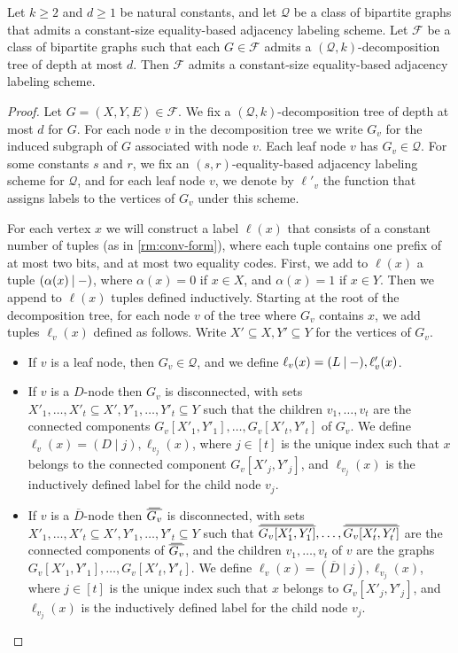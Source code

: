 \documentclass{article}
\newcommand\eqLabelSep{\mathbin|}
\newcommand{\cF}{\ensuremath{\mathcal{F}}}
\newcommand{\cQ}{\ensuremath{\mathcal{Q}}}
\newcommand\doverline[1]{%
  \setbox0=\hbox{$\!\overline{#1}\!$}%
  \ht0=\dimexpr\ht0-.2ex\relax%
  \,\overline{\copy0}\,%
}
\newcommand{\bc}[1]{\doverline{#1}} %
\begin{document}
\begin{lemma}
\label{lemma:bipartite decomposition}
Let $k \geq 2$ and $d \geq 1$ be natural constants, and let $\cQ$ be a class of bipartite graphs that
admits a constant-size equality-based adjacency labeling scheme.
Let $\cF$ be a class of bipartite graphs such that each $G \in \cF$ admits a $(\cQ, k)$-decomposition
tree of depth at most $d$. Then $\cF$ admits a constant-size equality-based adjacency labeling scheme. 
\end{lemma}
\begin{proof}
Let $G=(X,Y,E) \in \cF$. We fix a $(\cQ, k)$-decomposition tree of depth at most $d$ for $G$.
For each node $v$ in the decomposition tree we write $G_v$ for the induced subgraph
of $G$ associated with node $v$.  Each leaf node $v$ has $G_v \in \cQ$. 
For some constants $s$ and $r$, we fix an $(s,r)$-equality-based adjacency labeling scheme for $\cQ$, and for each leaf node $v$, we denote by $\ell'_v$ the function that assigns labels to the vertices of $G_v$ under this scheme.

For each vertex $x$ we will construct a label $\ell(x)$ that consists of a constant number of tuples (as in \cref{rm:conv-form}),
where each tuple contains one prefix of at most two bits, and at most two equality codes.
First, we add to $\ell(x)$ a tuple  $(\alpha(x) \eqLabelSep \mathnormal- )$, where $\alpha(x)=0$ if $x \in X$, and $\alpha(x)=1$
if $x \in Y$. Then we append to $\ell(x)$ tuples defined inductively.
Starting at the root of the decomposition tree, for each node $v$ of the tree where $G_v$ 
contains $x$, we add tuples $\ell_v(x)$ defined as follows.  
Write $X' \subseteq X, Y' \subseteq Y$ for the vertices of $G_v$.
\begin{itemize}
\item If $v$ is a leaf node, then $G_v \in \cQ$, and we define $\ell_v(x) = (L \eqLabelSep \mathnormal-), \ell'_v(x)$.

\item If $v$ is a $D$-node then $G_v$ is disconnected, with sets $X'_1, \dotsc, X'_t \subseteq X',
Y'_1, \dotsc, Y'_t \subseteq Y$ such that the children $v_1, \dotsc, v_t$ are the connected
components $G_v[X'_1, Y'_1], \dotsc, G_v[X'_t, Y'_t]$ of $G_v$. 
We define $\ell_v(x) = (D \eqLabelSep j), \ell_{v_j}(x)$, where $j \in [t]$ is the unique index such that $x$ belongs to the connected component $G_v[X'_j, Y'_j]$, and $\ell_{v_j}(x)$ is the inductively defined label for the child node $v_j$.

\item If $v$ is a $\overline D$-node then $\bc{G_v}$ is disconnected, with sets $X'_1, \dotsc, X'_t \subseteq X',
Y'_1, \dotsc, Y'_t \subseteq Y$ such that $\bc{G_v[X_1',Y_1']}, \dotsc,  \bc{G_v[X_t',Y_t']}$ 
are the connected components of $\bc{G_v}$, and the children $v_1, \dotsc, v_t$ of $v$ are the graphs $G_v[X'_1, Y'_1], \dotsc, G_v[X'_t, Y'_t]$. 
We define $\ell_v(x) = (\overline D \eqLabelSep j), \ell_{v_j}(x)$, where $j \in [t]$ is the unique index such that $x$ belongs to $G_v[X'_j, Y'_j]$, and $\ell_{v_j}(x)$ is the inductively defined label for the child node $v_j$.


\end{itemize}
\end{proof}
\end{document}
